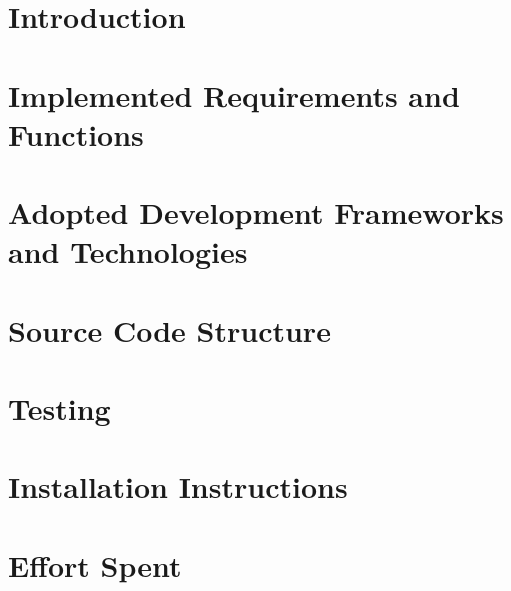 \documentclass[a4paper,11pt]{report}
\begin{document}
\clearpage
\chapter{{Introduction}}
\label{sect:introduction}


\clearpage
\chapter{{Implemented Requirements and Functions}}
\label{sect:implemented_requirements_and_functions}


\clearpage
\chapter{{Adopted Development Frameworks and Technologies}}
\label{sect:adopted_frameworks_and_technologies}


\clearpage
\chapter{{Source Code Structure}}
\label{sect:source_code_structure}

\clearpage
\chapter{{Testing}}
\label{sect:testing}

\clearpage
\chapter{{Installation Instructions}}
\label{sect:installation_instructions}


\clearpage
\chapter{Effort Spent}
\label{sect:effort}

\end{document}
